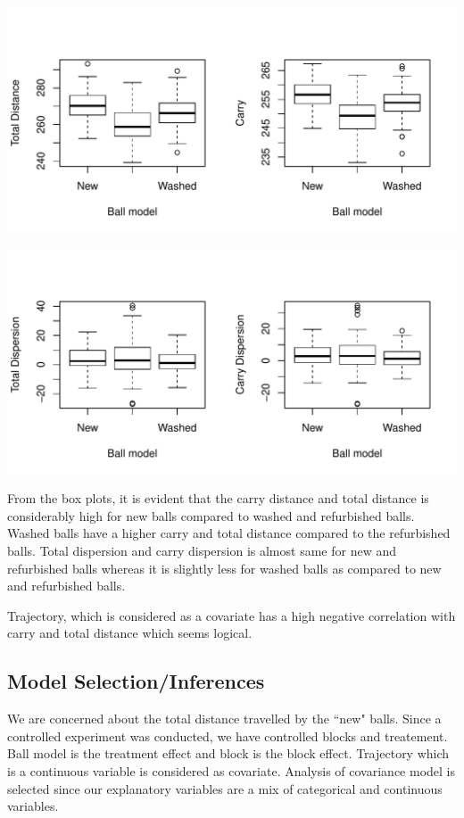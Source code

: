 \documentclass{article}\usepackage[]{graphicx}\usepackage[]{color}
\makeatletter
\def\maxwidth{ %
  \ifdim\Gin@nat@width>\linewidth
    \linewidth
  \else
    \Gin@nat@width
  \fi
}
\newenvironment{knitrout}{}{} %
\makeatother
\begin{document}
\begin{knitrout}
\color{fgcolor}
\includegraphics[width=\maxwidth]{figure/box_plots_distance-1} 

\end{knitrout}

\begin{knitrout}
\color{fgcolor}
\includegraphics[width=\maxwidth]{figure/box_plots_disp-1} 

\end{knitrout}
From the box plots, it is evident that the carry distance and total distance is considerably high for new balls compared to washed and refurbished balls. Washed balls have a higher carry and total distance compared to the refurbished balls. Total dispersion and carry dispersion is almost same for new and refurbished balls whereas it is slightly less for washed balls as compared to new and refurbished balls.

Trajectory, which is considered as a covariate has a high negative correlation with carry and total distance which seems logical.

\subsection*{Model Selection/Inferences}
We are concerned about the total distance travelled by the ``new" balls. Since a controlled experiment was conducted, we have controlled blocks and treatement. Ball model is the treatment effect and block is the block effect. Trajectory which is a continuous variable is considered as covariate. Analysis of covariance model is selected since our explanatory variables are a mix of categorical and continuous variables.
\end{document}
